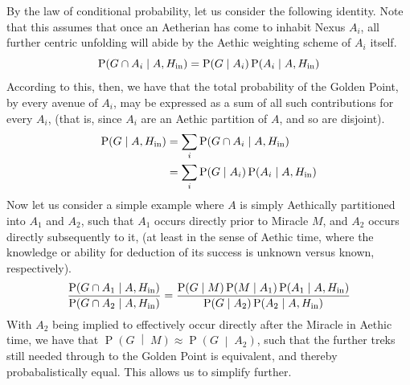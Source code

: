 By the law of conditional probability, let us consider the following identity. Note that this assumes that once an Aetherian has come to inhabit Nexus $A_i$, all further centric unfolding will abide by the Aethic weighting scheme of $A_i$ itself. 
\begin{equation}
    \operatorname{P} \! \left( G \cap A_i \;\middle|\; A, H_{\textnormal{in}} \right) = \operatorname{P} \! \left( G \;\middle|\; A_i \right) \operatorname{P} \! \left( A_i \;\middle|\; A, H_{\textnormal{in}} \right)
\end{equation}
According to this, then, we have that the total probability of the Golden Point, by every avenue of $A_i$, may be expressed as a sum of all such contributions for every $A_i$, (that is, since $A_i$ are an Aethic partition of $A$, and so are disjoint).
\begin{equation}
    \begin{aligned}
        \operatorname{P} \! \left( G \;\middle|\; A, H_{\textnormal{in}} \right) & = \sum_i \operatorname{P} \! \left( G \cap A_i \;\middle|\; A, H_{\textnormal{in}} \right) \\
        & = \sum_i \operatorname{P} \! \left( G \;\middle|\; A_i \right) \operatorname{P} \! \left( A_i \;\middle|\; A, H_{\textnormal{in}} \right)
    \end{aligned}
\end{equation}
Now let us consider a simple example where $A$ is simply Aethically partitioned into $A_1$ and $A_2$, such that $A_1$ occurs directly prior to Miracle $M$, and $A_2$ occurs directly subsequently to it, (at least in the sense of Aethic time, where the knowledge or ability for deduction of its success is unknown versus known, respectively). 
\begin{equation}
    \dfrac{\operatorname{P} \! \left( G \cap A_1 \;\middle|\; A, H_{\textnormal{in}} \right)}{\operatorname{P} \! \left( G \cap A_2 \;\middle|\; A, H_{\textnormal{in}} \right)} = \dfrac{\operatorname{P} \! \left( G \;\middle|\; M \right) \operatorname{P} \! \left( M \;\middle|\; A_1 \right) \operatorname{P} \! \left( A_1 \;\middle|\; A, H_{\textnormal{in}} \right)}{\operatorname{P} \! \left( G \;\middle|\; A_2 \right) \operatorname{P} \! \left( A_2 \;\middle|\; A, H_{\textnormal{in}} \right)}
\end{equation}
With $A_2$ being implied to effectively occur directly after the Miracle in Aethic time, we have that $\operatorname{P} \! \left( G \;\middle|\; M \right) \approx \operatorname{P} \! \left( G \;\middle|\; A_2 \right)$, such that the further treks still needed through to the Golden Point is equivalent, and thereby probabalistically equal. This allows us to simplify further. 
